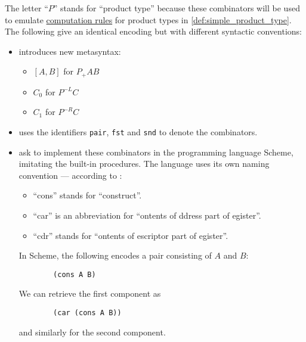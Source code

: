 \begin{example}
\begin{thmenum}
    The letter \enquote{\( P \)} stands for \enquote{product type} because these combinators will be used to emulate \hyperref[rem:type_theory_rule_classification/equality/comp]{computation rules} for product types in \cref{def:simple_product_type}. The following give an identical encoding but with different syntactic conventions:
    \begin{itemize}
      \item {} introduces new metasyntax:
      \begin{itemize}
        \item \( [A, B] \) for \( P_+ A B \)
        \item \( C_0 \) for \( P^{-L} C \)
        \item \( C_1 \) for \( P^{-R} C \)
      \end{itemize}

      \item {} uses the identifiers \verb|pair|, \verb|fst| and \verb|snd| to denote the combinators.

      \item {} ask to implement these combinators in the programming language Scheme, imitating the built-in procedures. The language uses its own naming convention --- according to \cite[115]{AbelsonSussman2012eSICP}:
      \begin{itemize}
        \item \enquote{cons} stands for \enquote{construct}.
        \item \enquote{car} is an abbreviation for \enquote{ontents of ddress part of egister}.
        \item \enquote{cdr} stands for \enquote{ontents of escriptor part of egister}.
      \end{itemize}

      In Scheme, the following encodes a pair consisting of \( A \) and \( B \):
      \begin{verbatim}
        (cons A B)
      \end{verbatim}\vspace{-\baselineskip}

      We can retrieve the first component as
      \begin{verbatim}
        (car (cons A B))
      \end{verbatim}\vspace{-\baselineskip}
      and similarly for the second component.
    \end{itemize}


\end{thmenum}
\end{example}
